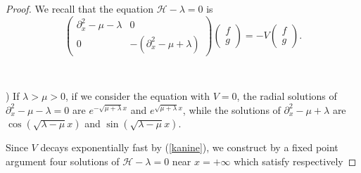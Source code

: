 \documentclass[10pt,a4paper]{amsart}
\begin{document}
\begin{proof}
  We recall that the equation $\mathcal{H}- \lambda = 0$ is
  \[ \left(\begin{array}{cc}
       \partial_x^2 - \mu - \lambda & 0\\
       0 & - (\partial_x^2 - \mu + \lambda)
     \end{array}\right) \left(\begin{array}{c}
       f\\
       g
     \end{array}\right) = - V \left(\begin{array}{c}
       f\\
       g
     \end{array}\right) . \]
  
  \
  
) If $\lambda > \mu > 0$, if we consider the equation with $V = 0$, the
  radial solutions of $\partial_x^2 - \mu - \lambda = 0$ are $e^{-\sqrt{\mu + \lambda} x} $ and $e^{\sqrt{\mu + \lambda} x} $, while the solutions of $\partial_x^2 - \mu +
  \lambda$ are $\cos \left( \sqrt{\lambda - \mu } x \right)$ and
  $\sin \left( \sqrt{\lambda - \mu } x \right)$.
  
  Since $V$ decays exponentially fast by (\ref{kanine}), we construct by a
  fixed point argument four solutions of $\mathcal{H}- \lambda = 0$ near $x =
  + \infty$ which satisfy respectively


\end{proof}
\end{document}
